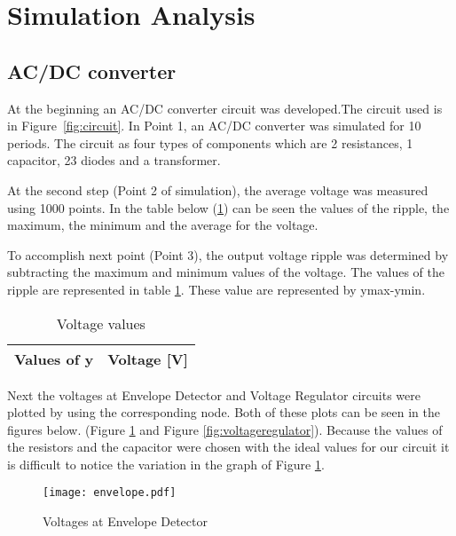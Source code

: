 \newpage
\section{Simulation Analysis}
\label{sec:simulation}

\subsection{AC/DC converter}
\label{sec:AC/DC converter}

At the beginning an AC/DC converter circuit was developed.The circuit used is in Figure~\ref{fig:circuit}. In Point 1, an AC/DC converter was simulated for 10 periods. The circuit as four types of components which are 2 resistances, 1 capacitor, 23 diodes and a transformer. 



At the second step (Point 2 of simulation), the average voltage was measured  using 1000 points. In the table below (\ref{tab:op_MAXMIN_tab}) can be seen the values of the ripple, the maximum, the minimum and the average for the voltage.
 
To accomplish next point (Point 3), the output voltage ripple was determined by subtracting the maximum and minimum values of the voltage. The values of the ripple are represented in table \ref{tab:op_MAXMIN_tab}. These value are represented by ymax-ymin.

\begin{table}[h]
  \centering
  \begin{tabular}{|l|r|}
    \hline    
    {\bf Values of y} & {\bf Voltage [V]} \\ \hline
    
  \end{tabular}
  \caption{Voltage values}
  \label{tab:op_MAXMIN_tab}
\end{table}




Next the voltages at Envelope Detector and Voltage Regulator circuits were plotted by using the corresponding node. Both of these plots can be seen in the figures below. (Figure \ref{fig:envelope} and Figure \ref{fig:voltageregulator}).
Because the values of the resistors and the capacitor were chosen with the ideal values for our circuit it is difficult to notice the variation in the graph of Figure \ref{fig:envelope}.  

\begin{figure}[h] \centering
\texttt{[image: envelope.pdf]}
\caption{Voltages at Envelope Detector}
\label{fig:envelope}
\end{figure}

